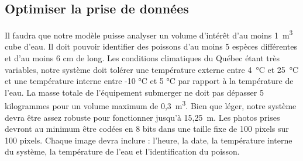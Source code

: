

\subsection{Optimiser la prise de données}
\label{s:beo_obj_optimdonn}

Il faudra que notre modèle puisse analyser un volume d’intérêt d’au moins 1~m\textsuperscript{3} cube d’eau.
Il doit pouvoir identifier des poissons d’au moins 5 espèces différentes et d’au moins 6 cm de long.
Les conditions climatiques du Québec étant très variables, notre système doit tolérer une température externe entre 4~°C et 25~°C et une température interne entre -10 °C et 5 °C par rapport à la température de l’eau.
La masse totale de l’équipement submerger ne doit pas dépasser 5 kilogrammes pour un volume maximum de 0,3~m\textsuperscript{3}.
Bien que léger, notre système devra être assez robuste pour fonctionner jusqu’à 15,25~m.
Les photos prises devront au minimum être codées en 8 bits dans une taille fixe de 100 pixels sur 100 pixels.
Chaque image devra inclure : l’heure, la date, la température interne du système, la température de l’eau et l’identification du poisson.